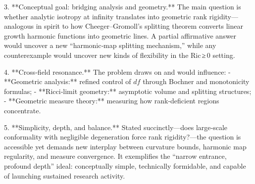 3. **Conceptual goal: bridging analysis and geometry.**  
   The main question is whether analytic isotropy at infinity translates into geometric rank rigidity—analogous in spirit to how Cheeger–Gromoll’s splitting theorem converts linear growth harmonic functions into geometric lines. A partial affirmative answer would uncover a new “harmonic‑map splitting mechanism,” while any counterexample would uncover new kinds of flexibility in the Ric ≥ 0 setting.

4. **Cross‑field resonance.**  
   The problem draws on and would influence:
   - **Geometric analysis:** refined control of \(df\) through Bochner and monotonicity formulas;  
   - **Ricci‑limit geometry:** asymptotic volume and splitting structures;  
   - **Geometric measure theory:** measuring how rank‑deficient regions concentrate.  

5. **Simplicity, depth, and balance.**  
   Stated succinctly—does large‑scale conformality with negligible degeneration force rank rigidity?—the question is accessible yet demands new interplay between curvature bounds, harmonic map regularity, and measure convergence. It exemplifies the “narrow entrance, profound depth” ideal: conceptually simple, technically formidable, and capable of launching sustained research activity.